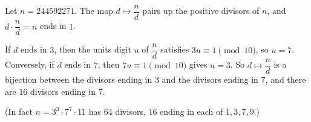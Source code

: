 Let $n=244592271$. The map $d\mapsto\dfrac {n}{d}$ pairs up the positive divisors of $n$, and $d\cdot\dfrac {n}{d}=n$ ends in $1$.

If $d$ ends in $3$, then the units digit $u$ of $\dfrac {n}{d}$ satisfies $3u\equiv1\pmod{10}$, so $u=7$. Conversely, if $d$ ends in $7$, then $7u\equiv1\pmod{10}$ gives $u=3$. So $d\mapsto\dfrac {n}{d}$ is a bijection between the divisors ending in $3$ and the divisors ending in $7$, and there are $\boxed{16}$ divisors ending in $7$.

(In fact $n=3^3\cdot7^7\cdot11$ has $64$ divisors, $16$ ending in each of $1,3,7,9$.)
